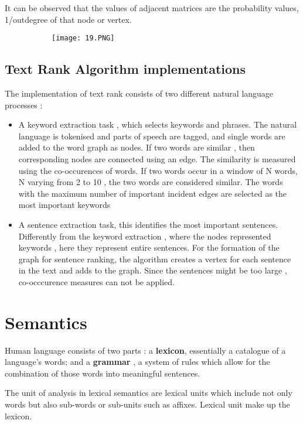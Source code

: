 \documentclass{article}
\begin{document}
It can be observed that the values of adjacent matrices are the probability values, 1/outdegree of that node or vertex.

\begin{figure}[ht!]
  \centering
  \begin{subfigure}[b]{0.9\linewidth}
    \texttt{[image: 19.PNG]}
  \end{subfigure}
\end{figure}

\subsection{Text Rank Algorithm implementations}

The implementation of text rank consists of two different natural language processes : 

\begin{itemize}
    \item A keyword extraction task , which selects keywords and phrases. The natural language is tokenised and parts of speech are tagged, and single words are added to the word graph as nodes. If two words are similar , then corresponding nodes are connected using an edge. The similarity is measured using the co-occurences of words. If two words occur in a window of N words, N varying from 2 to 10 , the two words are considered similar. The words with the maximum number of important incident edges are selected as the most important keywords
    \item A sentence extraction task, this identifies the most important sentences. Differently from the keyword extraction , where the nodes represented keywords , here they represent entire sentences. For the formation of the graph for sentence ranking, the algorithm creates a vertex for each sentence in the text and adds to the graph.
    Since the sentences might be too large , co-occcurence measures can not be applied.
\end{itemize}

\section{Semantics}

Human language consists of two parts : a \textbf{lexicon}, essentially a catalogue of a language's words; and a \textbf{grammar} , a system of rules which allow for the combination of those words into meaningful sentences.

The unit of analysis in lexical semantics are lexical units which include not only words but also sub-words or sub-units such as affixes. Lexical unit make up the lexicon.
\end{document}
